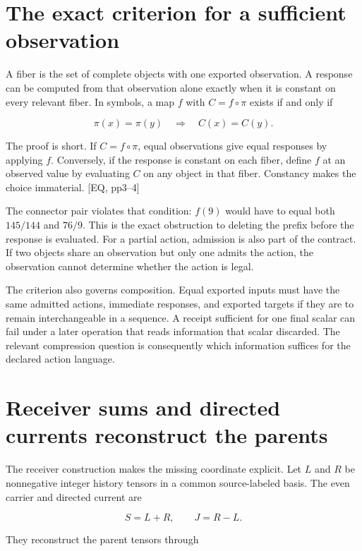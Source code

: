 \section{The exact criterion for a sufficient observation}\label{the-exact-criterion-for-a-sufficient-observation}

A fiber is the set of complete objects with one exported observation. A response can be computed from that observation alone exactly when it is constant on every relevant fiber. In symbols, a map \(f\) with \(C=f\circ\pi\) exists if and only if

\[
\pi(x)=\pi(y)\quad\Longrightarrow\quad C(x)=C(y).
\]

The proof is short. If \(C=f\circ\pi\), equal observations give equal responses by applying \(f\). Conversely, if the response is constant on each fiber, define \(f\) at an observed value by evaluating \(C\) on any object in that fiber. Constancy makes the choice immaterial. {[}EQ, pp3--4{]}

The connector pair violates that condition: \(f(9)\) would have to equal both \(145/144\) and \(76/9\). This is the exact obstruction to deleting the prefix before the response is evaluated. For a partial action, admission is also part of the contract. If two objects share an observation but only one admits the action, the observation cannot determine whether the action is legal.

The criterion also governs composition. Equal exported inputs must have the same admitted actions, immediate responses, and exported targets if they are to remain interchangeable in a sequence. A receipt sufficient for one final scalar can fail under a later operation that reads information that scalar discarded. The relevant compression question is consequently which information suffices for the declared action language.

\section{Receiver sums and directed currents reconstruct the parents}\label{receiver-sums-and-directed-currents-reconstruct-the-parents}

The receiver construction makes the missing coordinate explicit. Let \(L\) and \(R\) be nonnegative integer history tensors in a common source-labeled basis. The even carrier and directed current are

\[
S=L+R,\qquad J=R-L.
\]

They reconstruct the parent tensors through

